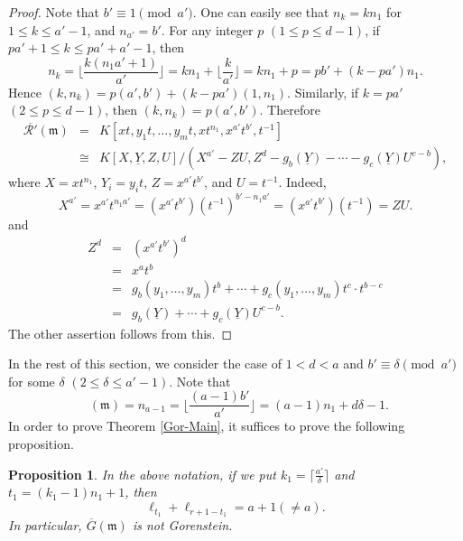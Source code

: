 \documentclass[12pt]{amsart}
\newtheorem{prop}[thm]{Proposition}
\theoremstyle{definition}
\theoremstyle{remark}
\numberwithin{equation}{section}
\newcommand{\m}{{\mathfrak m}}
\DeclareMathOperator{\br}{\bar r}
\begin{document}
\begin{proof}
Note that $b'\equiv 1 \pmod{a'}$. 
One can easily see that $n_k=kn_1$ for $1 \le k \le a'-1$, 
and $n_{a'}=b'$. 
For any integer $p$ $(1\le p \le d-1)$, if $pa'+1 \le k \le pa'+a'-1$, 
then 
\[
n_{k} =\lfloor \frac{k(n_1a'+1)}{a'} \rfloor 
= kn_1+ \lfloor \frac{k}{a'} \rfloor 
= kn_1+p = pb'+(k-pa')n_1. 
\]
Hence $(k,n_k)=p(a',b')+(k-pa')(1,n_1)$. 
Similarly, if $k=pa'$ $(2 \le p \le d-1)$, then $(k,n_k)=p(a',b')$. 
Therefore
\begin{eqnarray*}
\overline{\mathcal{R}'}(\m) 
&=& K[xt,y_1t,\ldots,y_mt,xt^{n_1},x^{a'}t^{b'},t^{-1}] \\[1mm]
& \cong & K[X,\underline{Y},Z,U]/(X^{a'}-ZU, Z^d-g_b({\underline{Y}})- \cdots -
g_c({\underline{Y}})U^{c-b}), 
\end{eqnarray*} 
where $X=xt^{n_1}$, $Y_i=y_it$, $Z=x^{a'}t^{b'}$, and $U=t^{-1}$. 
Indeed, 
\[
X^{a'}=x^{a'}t^{n_1a'}=(x^{a'}t^{b'})(t^{-1})^{b'-n_1a'}=(x^{a'}t^{b'})(t^{-1})=ZU.
\]
and 
\begin{eqnarray*}
Z^d &=&(x^{a'}t^{b'})^d \\
&=& x^at^b \\
&=&
g_b(y_1,\ldots,y_m)t^b+\cdots+g_c(y_1,\ldots,y_m)t^c \cdot t^{b-c}  \\
&=& g_b(\underline{Y})+\cdots + g_c(\underline{Y})U^{c-b}. 
\end{eqnarray*}
The other assertion follows from this. 
\end{proof}

\par \vspace{2mm}
In the rest of this section, we consider the case of $1 < d < a$ 
and $b' \equiv \delta \pmod{a'}$ for some $\delta$ 
$(2 \le \delta \le a'-1)$. 
Note that 
\[
\br(\m) =n_{a-1}=\lfloor \dfrac{(a-1)b'}{a'} \rfloor = (a-1)n_1+d\delta-1. 
\]
In order to prove Theorem \ref{Gor-Main}, it suffices to prove the 
following proposition. 

\begin{prop}
In the above notation, if we put $k_1=\lceil \frac{a'}{\delta} \rceil$ and 
$t_1=(k_1-1)n_1+1$, then 
\[
\ell_{t_1}+\ell_{r+1-t_1} =a+1 (\ne a). 
\]
In particular, $\overline{G}(\m)$ is \emph{not\/} Gorenstein. 
\end{prop}
\end{document}
